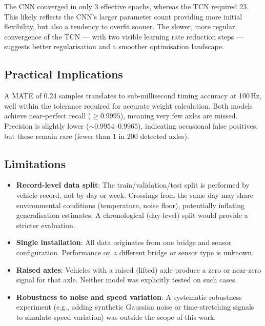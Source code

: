 The CNN converged in only 3 effective epochs, whereas the TCN required 23. This
likely reflects the CNN's larger parameter count providing more initial
flexibility, but also a tendency to overfit sooner. The slower, more regular
convergence of the TCN --- with two visible learning rate reduction steps ---
suggests better regularisation and a smoother optimisation landscape.

\subsection{Practical Implications}

A MATE of 0.24 samples translates to sub-millisecond timing accuracy at 100\,Hz,
well within the tolerance required for accurate weight calculation. Both models
achieve near-perfect recall ($\geq 0.9995$), meaning very few axles are missed.
Precision is slightly lower ($\sim 0.9954$--$0.9965$), indicating occasional
false positives, but these remain rare (fewer than 1 in 200 detected axles).

\subsection{Limitations}

\begin{itemize}
    \item \textbf{Record-level data split}: The train/validation/test split is
          performed by vehicle record, not by day or week. Crossings from the same
          day may share environmental conditions (temperature, noise floor),
          potentially inflating generalisation estimates. A chronological
          (day-level) split would provide a stricter evaluation.
    \item \textbf{Single installation}: All data originates from one bridge and
          sensor configuration. Performance on a different bridge or sensor type
          is unknown.
    \item \textbf{Raised axles}: Vehicles with a raised (lifted) axle produce a
          zero or near-zero signal for that axle. Neither model was explicitly
          tested on such cases.
    \item \textbf{Robustness to noise and speed variation}: A systematic
          robustness experiment (e.g., adding synthetic Gaussian noise or
          time-stretching signals to simulate speed variation) was outside the
          scope of this work.
\end{itemize}